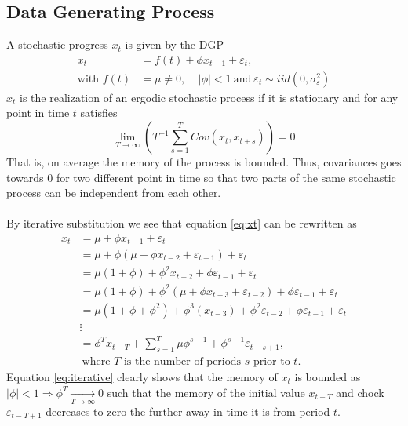 \subsection{Data Generating Process}
A stochastic progress $x_t$ is given by the DGP
\begin{equation}
  \begin{split}
    x_t &= f(t) + \phi x_{t-1}+\varepsilon_t,\\
    \text{with }f(t) &= \mu \neq 0,\ \ \ \ \ |\phi|<1\ \text{and}\ \varepsilon_t\sim iid(0,\sigma^2_\varepsilon)
    \label{eq:xt}
  \end{split}
\end{equation}
$x_t$ is the realization of an ergodic stochastic process if it is stationary and for any point in time $t$ satisfies
\begin{equation}
  \displaystyle{\lim_{T\to\infty}}\left(T^{-1}\sum_{s=1}^TCov(x_t,x_{t+s})\right)=0
\end{equation}
That is, on average the memory of the process is bounded. Thus, covariances goes towards $0$ for two different point in time so that two parts of the same stochastic process can be independent from each other.
\\ \\
By iterative substitution we see that equation \ref{eq:xt} can be rewritten as
\begin{equation}
  \begin{split}
    x_t &= \mu + \phi x_{t-1} +\varepsilon_t \\
        &= \mu + \phi (\mu + \phi x_{t-2}+\varepsilon_{t-1}) +\varepsilon_t\\
        &= \mu (1+\phi) + \phi^2 x_{t-2}+ \phi\varepsilon_{t-1} +\varepsilon_t\\
        &= \mu (1+\phi) + \phi^2 (\mu + \phi x_{t-3}+\varepsilon_{t-2})+ \phi\varepsilon_{t-1}+\varepsilon_t\\
        &= \mu (1+\phi+\phi^2) + \phi^3(x_{t-3})+ \phi^2\varepsilon_{t-2} + \phi\varepsilon_{t-1} +\varepsilon_t\\
        &\vdots \\
        &= \phi^T x_{t-T} + \sum_{s=1}^T \mu\phi^{s-1} + \phi^{s-1}\varepsilon_{t-s+1},\\
        &\ \text{where $T$ is the number of periods $s$ prior to $t$.}
        \label{eq:iterative}
  \end{split}
\end{equation}
Equation \ref{eq:iterative} clearly shows that the memory of $x_t$ is bounded as $|\phi|<1\Rightarrow \phi^T\xrightarrow[T\rightarrow\infty]{}0$ such that the memory of the initial value $x_{t-T}$ and chock $\varepsilon_{t-T+1}$ decreases to zero the further away in time it is from period $t$.

